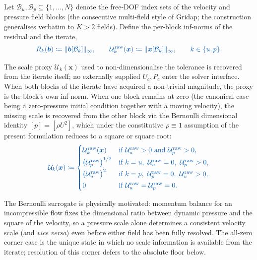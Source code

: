 \documentclass{article}
\newcommand{\extline}[1]{{\color{extcolor}#1}}
\begin{document}
\extline{Let $\mathcal{B}_{u}, \mathcal{B}_{p} \subseteq \{1,\dots,N\}$
denote the free-DOF index sets of the velocity and pressure field
blocks (the consecutive multi-field style of Gridap; the construction
generalises verbatim to $K > 2$ fields). Define the per-block
inf-norms of the residual and the iterate,}
\begin{equation}
    \label{eq:per-field-norms}
    \textcolor{extcolor}{
    R_{k}(\boldsymbol{b}) \coloneqq \|\boldsymbol{b}[\mathcal{B}_{k}]\|_{\infty},
    \qquad
    \mathcal{U}_{k}^{\mathrm{raw}}(\boldsymbol{x}) \coloneqq \|\boldsymbol{x}[\mathcal{B}_{k}]\|_{\infty},
    \qquad k \in \{u, p\}.}
\end{equation}

\extline{The scale proxy $\mathcal{U}_{k}(\boldsymbol{x})$ used to
non-dimensionalise the tolerance is recovered from the iterate
itself; no externally supplied $U_{c}, P_{c}$ enter the solver
interface. When both blocks of the iterate have acquired a
non-trivial magnitude, the proxy is the block's own inf-norm. When
one block remains at zero (the canonical case being a zero-pressure
initial condition together with a moving velocity), the missing scale
is recovered from the other block via the Bernoulli dimensional
identity $[p] = [\rho U^{2}]$, which under the constitutive
$\rho \equiv 1$ assumption of the present formulation reduces to a
square or square root:}
\begin{equation}
    \label{eq:per-field-scale-resolve}
    \textcolor{extcolor}{
    \mathcal{U}_{k}(\boldsymbol{x}) \coloneqq
    \begin{cases}
        \mathcal{U}_{k}^{\mathrm{raw}}(\boldsymbol{x})
            & \text{if } \mathcal{U}_{u}^{\mathrm{raw}}>0 \ \text{and}\ \mathcal{U}_{p}^{\mathrm{raw}}>0, \\[2pt]
        \bigl(\mathcal{U}_{p}^{\mathrm{raw}}\bigr)^{1/2}
            & \text{if } k = u,\ \mathcal{U}_{u}^{\mathrm{raw}} = 0,\ \mathcal{U}_{p}^{\mathrm{raw}} > 0, \\[2pt]
        \bigl(\mathcal{U}_{u}^{\mathrm{raw}}\bigr)^{2}
            & \text{if } k = p,\ \mathcal{U}_{p}^{\mathrm{raw}} = 0,\ \mathcal{U}_{u}^{\mathrm{raw}} > 0, \\[2pt]
        0
            & \text{if } \mathcal{U}_{u}^{\mathrm{raw}} = \mathcal{U}_{p}^{\mathrm{raw}} = 0.
    \end{cases}}
\end{equation}

\extline{The Bernoulli surrogate is physically motivated: momentum
balance for an incompressible flow fixes the dimensional ratio
between dynamic pressure and the square of the velocity, so a
pressure scale alone determines a consistent velocity scale (and
\emph{vice versa}) even before either field has been fully resolved.
The all-zero corner case is the unique state in which no scale
information is available from the iterate; resolution of this corner
defers to the absolute floor below.}
\end{document}
